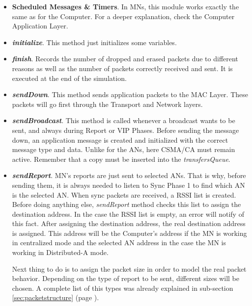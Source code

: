 \begin{itemize}
  \item \textbf{Scheduled Messages \& Timers}. In \acp{MN}, this module works exactly the same as for the Computer. For a deeper explanation, check
  the Computer Application Layer.

  \item \textbf{\textit{initialize}}. This method just initializes some variables.

  \item \textbf{\textit{finish}}. Records the number of dropped and erased packets due to different reasons as well as the number of packets
  correctly received and sent. It is executed at the end of the simulation.

  \item \textbf{\textit{sendDown}}. This method sends application packets to the \ac{MAC} Layer. These packets will go first through the Transport 
  and Network layers.

  \item \textbf{\textit{sendBroadcast}}. This method is called whenever a broadcast wants to be sent, and always during Report or \ac{VIP} Phases. 
  Before sending the message down, an application message is created and initialized with the correct message type and data. Unlike for the \acp{AN},
  here \ac{CSMA/CA} must remain active. Remember that a copy must be inserted into the \textit{transfersQueue}.

  \item \textbf{\textit{sendReport}}. \ac{MN}'s reports are just sent to selected \acp{AN}. That is why, before sending them, it is always needed
  to listen to Sync Phase 1 to find which \ac{AN} is the selected \ac{AN}. When sync packets are received, a \ac{RSSI} list is created. Before 
  doing anything else, \textit{sendReport} method checks this list to assign the destination address. In the case the \ac{RSSI} list is empty, an 
  error will notify of this fact. After assigning the destination address, the real destination address is assigned. This address will be 
  the Computer's address if the \ac{MN} is working in centralized mode and the selected \ac{AN} address in the case the \ac{MN} is working in 
  Distributed-A mode.

  Next thing to do is to assign the packet size in order to model the real packet behavior. Depending on the type of report to be sent, different 
  sizes will be chosen. A complete list of this types was already explained in sub-section \ref{sec:packetstructure} (page 
  \pageref{sec:packetstructure}).


\end{itemize}
